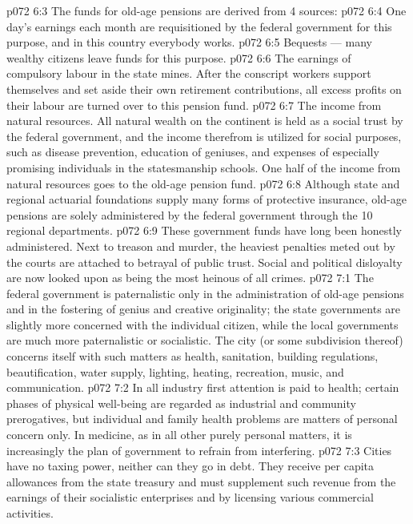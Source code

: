 \vs p072 6:3 \pc The funds for old\hyp{}age pensions are derived from 4 sources:
\vs p072 6:4 \bibnobreakspace One day’s earnings each month are requisitioned by the federal government for this purpose, and in this country everybody works.
\vs p072 6:5 \bibnobreakspace Bequests --- many wealthy citizens leave funds for this purpose.
\vs p072 6:6 \bibnobreakspace The earnings of compulsory labour in the state mines. After the conscript workers support themselves and set aside their own retirement contributions, all excess profits on their labour are turned over to this pension fund.
\vs p072 6:7 \bibnobreakspace The income from natural resources. All natural wealth on the continent is held as a social trust by the federal government, and the income therefrom is utilized for social purposes, such as disease prevention, education of geniuses, and expenses of especially promising individuals in the statesmanship schools. One half of the income from natural resources goes to the old\hyp{}age pension fund.
\vs p072 6:8 \pc Although state and regional actuarial foundations supply many forms of protective insurance, old\hyp{}age pensions are solely administered by the federal government through the 10 regional departments.
\vs p072 6:9 These government funds have long been honestly administered. Next to treason and murder, the heaviest penalties meted out by the courts are attached to betrayal of public trust. Social and political disloyalty are now looked upon as being the most heinous of all crimes.
\vs p072 7:1 The federal government is paternalistic only in the administration of old\hyp{}age pensions and in the fostering of genius and creative originality; the state governments are slightly more concerned with the individual citizen, while the local governments are much more paternalistic or socialistic. The city (or some subdivision thereof) concerns itself with such matters as health, sanitation, building regulations, beautification, water supply, lighting, heating, recreation, music, and communication.
\vs p072 7:2 In all industry first attention is paid to health; certain phases of physical well\hyp{}being are regarded as industrial and community prerogatives, but individual and family health problems are matters of personal concern only. In medicine, as in all other purely personal matters, it is increasingly the plan of government to refrain from interfering.
\vs p072 7:3 \pc Cities have no taxing power, neither can they go in debt. They receive per capita allowances from the state treasury and must supplement such revenue from the earnings of their socialistic enterprises and by licensing various commercial activities.
